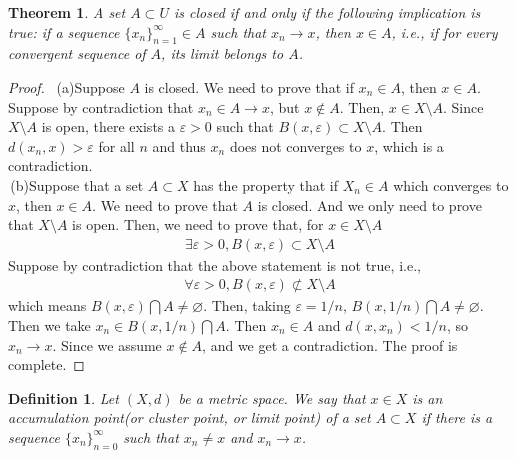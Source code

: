 \documentclass[12pt,leqno]{amsart}
\newtheorem{theorem}{Theorem}[section]
\newtheorem{definition}{Definition}[section]
\theoremstyle{definition}
\begin{document}
\medskip

\begin{theorem}
A set $A\subset U$ is closed if and only if the following implication is true: if a sequence $\{x_n\}_{n=1}^\infty\in A$ such that $x_n\rightarrow x$, then $x\in A$, i.e., if for every convergent sequence of $A$, its limit belongs to $A$.
\end{theorem}
\begin{proof}
$ $ \newline
\hspace*{1em}\,(a)Suppose $A$ is closed. We need to prove that if $x_n \in A$, then $x\in A$. Suppose by contradiction that $x_n\in A \rightarrow x$, but $x\notin A$. Then, $x\in X\setminus A$. Since $X\setminus A$ is open, there exists a $\varepsilon > 0$ such that $B(x,\varepsilon) \subset X\setminus A$. Then $d(x_n,x) > \varepsilon$ for all $n$ and thus $x_n$ does not converges to $x$, which is a contradiction. \\
\hspace*{1em}\,(b)Suppose that a set $A\subset X$ has the property that if $X_n \in A$ which converges to $x$, then $x\in A$. We need to prove that $A$ is closed. And we only need to prove that $X\setminus A$ is open. Then, we need to prove that, for $x\in X\setminus A$
\begin{align*}
    \exists \varepsilon > 0, B(x, \varepsilon)\subset X\setminus A
\end{align*}
\hspace*{1em}Suppose by contradiction that the above statement is not true, i.e., 
\begin{align*}
    \forall \varepsilon > 0, B(x,\varepsilon)\not\subset X\setminus A
\end{align*}
which means $B(x,\varepsilon)\bigcap A \neq \varnothing$. Then, taking $\varepsilon = 1/n$, $B(x,1/n)\bigcap A \neq \varnothing$. Then we take $x_n\in B(x,1/n)\bigcap A$. Then $x_n\in A$ and $d(x,x_n) < 1/n$, so $x_n\rightarrow x$. Since we assume $x\notin A$, and we get a contradiction. The proof is complete.
\end{proof}

\begin{definition}
Let $(X,d)$ be a metric space. We say that $x\in X$ is an accumulation point(or cluster point, or limit point) of a set $A\subset X$ if there is a sequence $\{x_n\}^\infty_{n=0}$ such that $x_n\neq x$ and $x_n \rightarrow x$.
\end{definition}

\medskip
\end{document}
